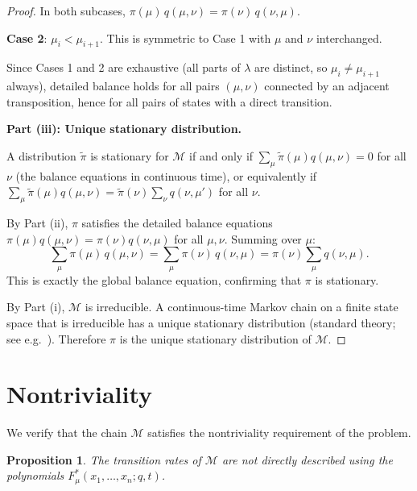 \documentclass[12pt]{article}
\newtheorem{proposition}[theorem]{Proposition}
\begin{document}
\begin{proof}
In both subcases, $\pi(\mu)\,q(\mu,\nu) = \pi(\nu)\,q(\nu,\mu)$.

\textbf{Case 2}: $\mu_i < \mu_{i+1}$. This is symmetric to Case 1 with $\mu$ and $\nu$ interchanged.

Since Cases 1 and 2 are exhaustive (all parts of $\lambda$ are distinct, so $\mu_i \neq \mu_{i+1}$ always), detailed balance holds for all pairs $(\mu, \nu)$ connected by an adjacent transposition, hence for all pairs of states with a direct transition.

\bigskip
\noindent\textbf{Part (iii): Unique stationary distribution.}

A distribution $\tilde{\pi}$ is stationary for $\mathcal{M}$ if and only if $\sum_\mu \tilde{\pi}(\mu) q(\mu,\nu) = 0$ for all $\nu$ (the balance equations in continuous time), or equivalently if $\sum_\mu \tilde{\pi}(\mu) q(\mu,\nu) = \tilde{\pi}(\nu) \sum_\nu q(\nu,\mu')$ for all $\nu$.

By Part (ii), $\pi$ satisfies the detailed balance equations $\pi(\mu) q(\mu,\nu) = \pi(\nu) q(\nu,\mu)$ for all $\mu, \nu$. Summing over $\mu$:
\[
\sum_{\mu} \pi(\mu)\, q(\mu,\nu) = \sum_\mu \pi(\nu)\,q(\nu,\mu) = \pi(\nu) \sum_\mu q(\nu,\mu).
\]
This is exactly the global balance equation, confirming that $\pi$ is stationary.

By Part (i), $\mathcal{M}$ is irreducible. A continuous-time Markov chain on a finite state space that is irreducible has a unique stationary distribution (standard theory; see e.g.\ \cite[Chapter~3]{norris}). Therefore $\pi$ is the unique stationary distribution of $\mathcal{M}$.
\end{proof}

\section{Nontriviality}

We verify that the chain $\mathcal{M}$ satisfies the nontriviality requirement of the problem.

\begin{proposition}\label{prop:nontrivial}
The transition rates of $\mathcal{M}$ are not directly described using the polynomials $F^*_\mu(x_1,\dots,x_n;q,t)$.
\end{proposition}
\end{document}
